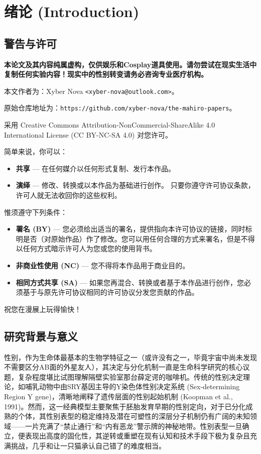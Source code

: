 
\section{绪论 (Introduction)}

\subsection{警告与许可}

\textbf{本论文及其内容纯属虚构，仅供娱乐和Cosplay道具使用。请勿尝试在现实生活中复制任何实验内容！现实中的性别转变请务必咨询专业医疗机构。}

本文作者为：Xyber Nova \texttt{<xyber-nova@outlook.com>}。

原始仓库地址为：\texttt{https://github.com/xyber-nova/the-mahiro-papers}。

采用 Creative Commons Attribution-NonCommercial-ShareAlike 4.0 International License (CC BY-NC-SA 4.0) 对您许可。

简单来说，你可以：

\begin{itemize}
    \item \textbf{共享} — 在任何媒介以任何形式复制、发行本作品。
    \item \textbf{演绎} — 修改、转换或以本作品为基础进行创作。 只要你遵守许可协议条款，许可人就无法收回你的这些权利。
\end{itemize}

惟须遵守下列条件：

\begin{itemize}
    \item \textbf{署名 (BY)} — 您必须给出适当的署名，提供指向本许可协议的链接，同时标明是否（对原始作品）作了修改。您可以用任何合理的方式来署名，但是不得以任何方式暗示许可人为您或您的使用背书。
    \item \textbf{非商业性使用 (NC)} — 您不得将本作品用于商业目的。
    \item \textbf{相同方式共享 (SA)} — 如果您再混合、转换或者基于本作品进行创作，您必须基于与原先许可协议相同的许可协议分发您贡献的作品。
\end{itemize}

祝您在漫展上玩得愉快！

\subsection{研究背景与意义}

性别，作为生命体最基本的生物学特征之一（或许没有之一，毕竟宇宙中尚未发现不需要区分AB面的外星友人），其决定与分化机制一直是生命科学研究的核心议题，复杂程度堪比试图理解隔壁实验室那台薛定谔的咖啡机。传统的性别决定理论，如哺乳动物中由SRY基因主导的Y染色体性别决定系统 (Sex-determining Region Y gene)，清晰地阐释了遗传层面的性别起始机制 (Koopman et al., 1991)。然而，这一经典模型主要聚焦于胚胎发育早期的性别定向，对于已分化成熟的个体，其性别表型的稳定维持及潜在可塑性的深层分子机制仍有广阔的未知领域——一片充满了“禁止通行”和“内有恶龙”警示牌的神秘地带。性别表型一旦确立，便表现出高度的固化性，其逆转或重塑在现有认知和技术手段下极为复杂且充满挑战，几乎和让一只猫承认自己错了的难度相当。

